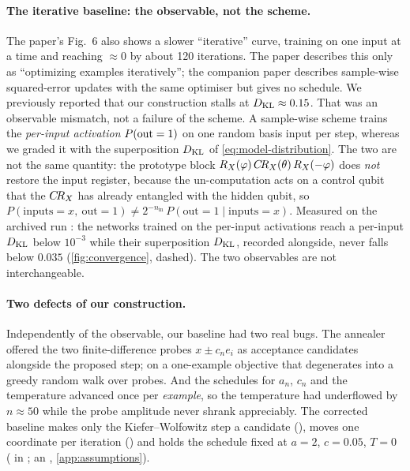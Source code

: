 \paragraph{The iterative baseline: the observable, not the scheme.}
The paper's Fig.~6 also shows a slower ``iterative'' curve, training on one input at a time and
reaching $\approx 0$ by about 120 iterations.  The paper describes this only as ``optimizing
examples iteratively''; the companion paper \cite{snn} describes sample-wise squared-error updates
with the same optimiser but gives no schedule.  We previously reported that our construction
stalls at $D_{\mathrm{KL}}\approx 0.15$.  That was an observable mismatch, not a failure of the scheme.  A
sample-wise scheme trains the \emph{per-input activation} $P(\mathrm{out}=1)$ on one random basis input per
step, whereas we graded it with the superposition $D_{\mathrm{KL}}$ of \cref{eq:model-distribution}.  The two
are not the same quantity: the prototype block $R_X(\varphi)\,C\!R_X(\theta)\,R_X(-\varphi)$ does
\emph{not} restore the input register, because the un-computation acts on a control qubit that the
$C\!R_X$ has already entangled with the hidden qubit, so
$P(\text{inputs}=x,\ \mathrm{out}=1) \neq 2^{-n_{\mathrm{in}}}\,
P(\mathrm{out}=1 \mid \text{inputs}=x)$.  Measured on the archived run
: the networks trained on the per-input activations reach a
per-input $D_{\mathrm{KL}}$ below $10^{-3}$ while their superposition $D_{\mathrm{KL}}$, recorded alongside, never falls
below $0.035$ (\cref{fig:convergence}, dashed).  The two observables are not interchangeable.

\paragraph{Two defects of our construction.}
Independently of the observable, our baseline had two real bugs.  The annealer offered the two
finite-difference probes $x \pm c_n e_i$ as acceptance candidates alongside the proposed step; on
a one-example objective that degenerates into a greedy random walk over probes.  And the schedules
for $a_n$, $c_n$ and the temperature advanced once per \emph{example}, so the temperature had
underflowed by $n\approx 50$ while the probe amplitude never shrank appreciably.  The corrected
baseline makes only the Kiefer--Wolfowitz step a candidate
(), moves one coordinate per iteration
() and holds the schedule fixed at $a = 2$, $c = 0.05$, $T = 0$
( in ; an \code{[ASSUMPTION]},
\cref{app:assumptions}).

